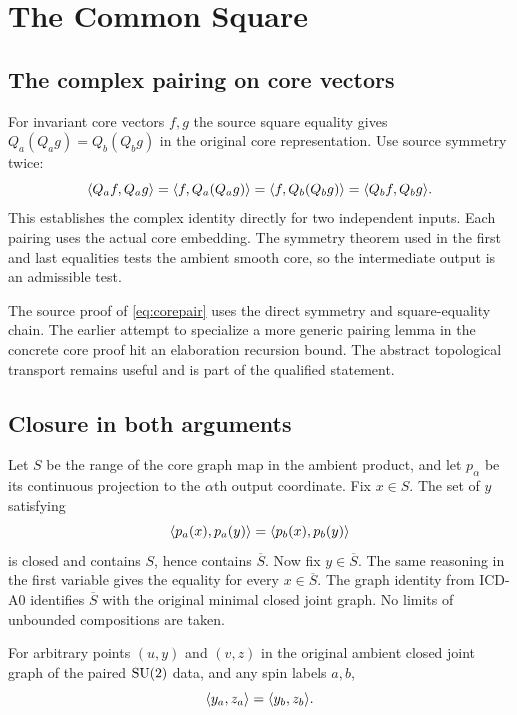 \chapter{The Common Square}\label{ch:square}

\section{The complex pairing on core vectors}
For invariant core vectors $f,g$ the source square equality gives
$Q_a(Q_a g)=Q_b(Q_b g)$ in the original core representation. Use source symmetry twice:
\begin{equation}
 \langle Q_a f,Q_a g\rangle=\langle f,Q_a(Q_a g)\rangle
                 =\langle f,Q_b(Q_b g)\rangle
                 =\langle Q_b f,Q_b g\rangle.
 \label{eq:corepair}
\end{equation}
This establishes the complex identity directly for two independent inputs. Each pairing uses the actual core embedding. The symmetry theorem used in the first and last equalities tests the ambient smooth core, so the intermediate output is an admissible test.

The source proof of \eqref{eq:corepair} uses the direct symmetry and square-equality chain. The earlier attempt to specialize a more generic pairing lemma in the concrete core proof hit an elaboration recursion bound. The abstract topological transport remains useful and is part of the qualified statement.

\section{Closure in both arguments}
Let $S$ be the range of the core graph map in the ambient product, and let $p_\alpha$ be its continuous projection to the $\alpha$th output coordinate. Fix $x\in S$. The set of $y$ satisfying
\[
 \langle p_a(x),p_a(y)\rangle=\langle p_b(x),p_b(y)\rangle
\]
is closed and contains $S$, hence contains $\overline S$. Now fix $y\in\overline S$. The same reasoning in the first variable gives the equality for every $x\in\overline S$. The graph identity from ICD-A0 identifies $\overline S$ with the original minimal closed joint graph. No limits of unbounded compositions are taken.

\begin{theorem}
For arbitrary points $(u,y)$ and $(v,z)$ in the original ambient closed joint graph of the paired $\operatorname{SU}(2)$ data, and any spin labels $a,b$,
\[
 \langle y_a,z_a\rangle=\langle y_b,z_b\rangle.
\]
\end{theorem}

